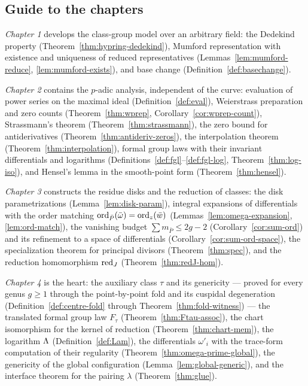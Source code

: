 \subsection*{Guide to the chapters}

\emph{Chapter 1} develops the class-group model over an arbitrary field: the Dedekind
property (Theorem~\ref{thm:hypring-dedekind}), Mumford representation with existence and
uniqueness of reduced representatives (Lemmas~\ref{lem:mumford-reduce},
\ref{lem:mumford-exists}), and base change (Definition~\ref{def:basechange}).

\emph{Chapter 2} contains the $p$-adic analysis, independent of the curve: evaluation of
power series on the maximal ideal (Definition~\ref{def:eval}), Weierstrass preparation and
zero counts (Theorem~\ref{thm:wprep}, Corollary~\ref{cor:wprep-count}), Strassmann's
theorem (Theorem~\ref{thm:strassmann}), the zero bound for antiderivatives
(Theorem~\ref{thm:antideriv-zeros}), the interpolation theorem
(Theorem~\ref{thm:interpolation}), formal group laws with their invariant differentials
and logarithms (Definitions~\ref{def:fgl}--\ref{def:fgl-log},
Theorem~\ref{thm:log-iso}), and Hensel's lemma in the smooth-point form
(Theorem~\ref{thm:hensel}).

\emph{Chapter 3} constructs the residue disks and the reduction of classes: the disk
parametrizations (Lemma~\ref{lem:disk-param}), integral expansions of differentials with
the order matching $\operatorname{ord}_{\bar P}(\bar\omega) = \operatorname{ord}_z(\bar w)$
(Lemmas~\ref{lem:omega-expansion}, \ref{lem:ord-match}), the vanishing budget
$\sum m_{\bar P} \le 2g-2$ (Corollary~\ref{cor:sum-ord}) and its refinement to a space of
differentials (Corollary~\ref{cor:sum-ord-space}), the specialization theorem for
principal divisors (Theorem~\ref{thm:spec}), and the reduction homomorphism $\operatorname{red}_J$
(Theorem~\ref{thm:redJ-hom}).

\emph{Chapter 4} is the heart: the auxiliary class $\tau$ and its genericity --- proved
for every genus $g \ge 1$ through the point-by-point fold and its cuspidal degeneration
(Definition~\ref{def:centre-fold} through Theorem~\ref{thm:fold-witness}) --- the
translated formal group law $F_\tau$ (Theorem~\ref{thm:Ftau-assoc}), the chart
isomorphism for the kernel of reduction (Theorem~\ref{thm:chart-mem}), the logarithm
$\Lambda$ (Definition~\ref{def:Lam}), the differentials $\omega'_i$ with the trace-form
computation of their regularity (Theorem~\ref{thm:omega-prime-global}), the genericity of
the global configuration (Lemma~\ref{lem:global-generic}), and the interface theorem for
the pairing $\lambda$ (Theorem~\ref{thm:glue}).


